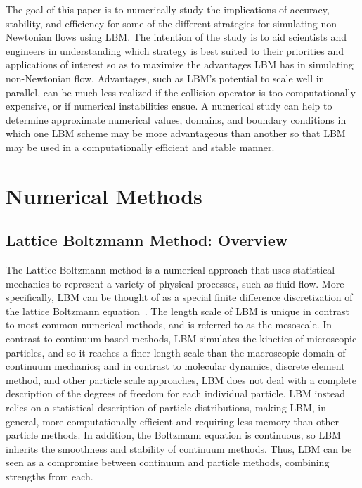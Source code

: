 \documentclass{article}
\begin{document}
The goal of this paper is to numerically study the implications of accuracy, stability, and efficiency for some of the different strategies for simulating non-Newtonian flows using LBM. The intention of the study is to aid scientists and engineers in understanding which strategy is best suited to their priorities and applications of interest so as to maximize the advantages LBM has in simulating non-Newtonian flow.
Advantages, such as LBM's potential to scale well in parallel, can be much less realized if the collision operator is too computationally expensive, or if numerical instabilities ensue.
A numerical study can help to determine approximate numerical values, domains, and boundary conditions in which one LBM scheme may be more advantageous than another so that LBM may be used in a computationally efficient and stable manner.

\section{Numerical Methods}


\subsection{Lattice Boltzmann Method: Overview}

The Lattice Boltzmann method is a numerical approach that uses statistical mechanics to represent a variety of physical processes, such as fluid flow.
More specifically, LBM can be thought of as a special finite difference discretization of the lattice Boltzmann equation~\cite{chen1998lattice}.
The length scale of LBM is unique in contrast to most common numerical methods, and is referred to as the mesoscale.
In contrast to continuum based methods, LBM simulates the kinetics of microscopic particles, and so it reaches a finer length scale than the macroscopic domain of continuum mechanics; and in contrast to molecular dynamics, discrete element method, and other particle scale approaches, LBM does not deal with a complete description of the degrees of freedom for each individual particle.
LBM instead relies on a statistical description of particle distributions, making LBM, in general, more computationally efficient and requiring less memory than other particle methods.
In addition, the Boltzmann equation is continuous, so LBM inherits the smoothness and stability of continuum methods.
Thus, LBM can be seen as a compromise between continuum and particle methods, combining strengths from each.
\end{document}
